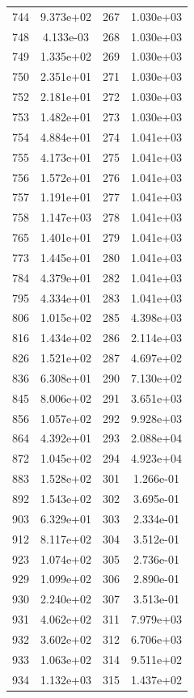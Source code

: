 \documentclass[12pt]{article}
\begin{document}
\begin{longtable}{@{}cccc@{}}
744 & 9.373e+02 & 267 & 1.030e+03 \\
748 & 4.133e-03 & 268 & 1.030e+03 \\
749 & 1.335e+02 & 269 & 1.030e+03 \\
750 & 2.351e+01 & 271 & 1.030e+03 \\
752 & 2.181e+01 & 272 & 1.030e+03 \\
753 & 1.482e+01 & 273 & 1.030e+03 \\
754 & 4.884e+01 & 274 & 1.041e+03 \\
755 & 4.173e+01 & 275 & 1.041e+03 \\
756 & 1.572e+01 & 276 & 1.041e+03 \\
757 & 1.191e+01 & 277 & 1.041e+03 \\
758 & 1.147e+03 & 278 & 1.041e+03 \\
765 & 1.401e+01 & 279 & 1.041e+03 \\
773 & 1.445e+01 & 280 & 1.041e+03 \\
784 & 4.379e+01 & 282 & 1.041e+03 \\
795 & 4.334e+01 & 283 & 1.041e+03 \\
806 & 1.015e+02 & 285 & 4.398e+03 \\
816 & 1.434e+02 & 286 & 2.114e+03 \\
826 & 1.521e+02 & 287 & 4.697e+02 \\
836 & 6.308e+01 & 290 & 7.130e+02 \\
845 & 8.006e+02 & 291 & 3.651e+03 \\
856 & 1.057e+02 & 292 & 9.928e+03 \\
864 & 4.392e+01 & 293 & 2.088e+04 \\
872 & 1.045e+02 & 294 & 4.923e+04 \\
883 & 1.528e+02 & 301 & 1.266e-01 \\
892 & 1.543e+02 & 302 & 3.695e-01 \\
903 & 6.329e+01 & 303 & 2.334e-01 \\
912 & 8.117e+02 & 304 & 3.512e-01 \\
923 & 1.074e+02 & 305 & 2.736e-01 \\
929 & 1.099e+02 & 306 & 2.890e-01 \\
930 & 2.240e+02 & 307 & 3.513e-01 \\
931 & 4.062e+02 & 311 & 7.979e+03 \\
932 & 3.602e+02 & 312 & 6.706e+03 \\
933 & 1.063e+02 & 314 & 9.511e+02 \\
934 & 1.132e+03 & 315 & 1.437e+02 \\

\end{longtable}
\end{document}
